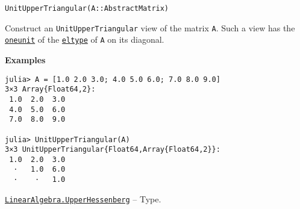 \begin{adjustwidth}{2em}{0pt}


\begin{verbatim}
UnitUpperTriangular(A::AbstractMatrix)
\end{verbatim}

Construct an \texttt{UnitUpperTriangular} view of the matrix \texttt{A}. Such a view has the \hyperlink{2310843180104103470}{\texttt{oneunit}} of the \hyperlink{6396209842929672718}{\texttt{eltype}} of \texttt{A} on its diagonal.

\textbf{Examples}


\begin{verbatim}
julia> A = [1.0 2.0 3.0; 4.0 5.0 6.0; 7.0 8.0 9.0]
3×3 Array{Float64,2}:
 1.0  2.0  3.0
 4.0  5.0  6.0
 7.0  8.0  9.0

julia> UnitUpperTriangular(A)
3×3 UnitUpperTriangular{Float64,Array{Float64,2}}:
 1.0  2.0  3.0
  ⋅   1.0  6.0
  ⋅    ⋅   1.0
\end{verbatim}



\end{adjustwidth}
\hypertarget{6167777885202579792}{} 
\hyperlink{6167777885202579792}{\texttt{LinearAlgebra.UpperHessenberg}}  -- {Type.}

